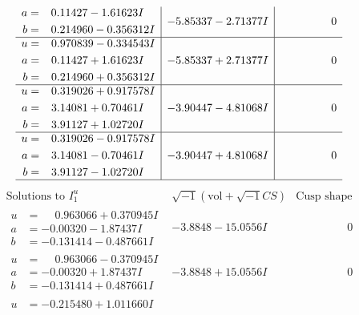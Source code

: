 \documentclass[1p]{elsarticle_modified}
\theoremstyle{definition}
\newcommand{\I}{\sqrt{-1}}
\begin{document}
$$\begin{array}{c|c|c}
\begin{aligned}
a &= \phantom{-}0.11427 - 1.61623 I \\
b &= \phantom{-}0.214960 - 0.356312 I\end{aligned}
 & -5.85337 - 2.71377 I & \phantom{-0.000000 } 0 \\ \hline\begin{aligned}
u &= \phantom{-}0.970839 - 0.334543 I \\
a &= \phantom{-}0.11427 + 1.61623 I \\
b &= \phantom{-}0.214960 + 0.356312 I\end{aligned}
 & -5.85337 + 2.71377 I & \phantom{-0.000000 } 0 \\ \hline\begin{aligned}
u &= \phantom{-}0.319026 + 0.917578 I \\
a &= \phantom{-}3.14081 + 0.70461 I \\
b &= \phantom{-}3.91127 + 1.02720 I\end{aligned}
 & -3.90447 - 4.81068 I & \phantom{-0.000000 } 0 \\ \hline\begin{aligned}
u &= \phantom{-}0.319026 - 0.917578 I \\
a &= \phantom{-}3.14081 - 0.70461 I \\
b &= \phantom{-}3.91127 - 1.02720 I\end{aligned}
 & -3.90447 + 4.81068 I & \phantom{-0.000000 } 0\\
 \hline 
 \end{array}$$\newpage$$\begin{array}{c|c|c}  
\text{Solutions to }I^u_{1}& \I (\text{vol} + \sqrt{-1}CS) & \text{Cusp shape}\\
 \hline 
\begin{aligned}
u &= \phantom{-}0.963066 + 0.370945 I \\
a &= -0.00320 - 1.87437 I \\
b &= -0.131414 - 0.487661 I\end{aligned}
 & -3.8848 - 15.0556 I & \phantom{-0.000000 } 0 \\ \hline\begin{aligned}
u &= \phantom{-}0.963066 - 0.370945 I \\
a &= -0.00320 + 1.87437 I \\
b &= -0.131414 + 0.487661 I\end{aligned}
 & -3.8848 + 15.0556 I & \phantom{-0.000000 } 0 \\ \hline\begin{aligned}
u &= -0.215480 + 1.011660 I \\

\end{aligned}
\end{array}$$
\end{document}
